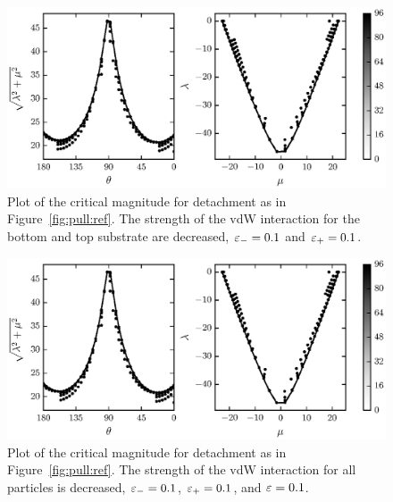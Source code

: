    \begin{figure}[t]
      \begin{center}
         \includegraphics{./fig/ch3/pull/eb0.1_et0.1/grid.eps}
      \end{center}      
      \caption{Plot of the critical magnitude for detachment as in Figure~\ref{fig:pull:ref}. The strength of the vdW interaction for the bottom and top substrate are decreased, $\varepsilon_-=0.1$ and $\varepsilon_+=0.1$.
      \label{fig:pull:eb0.1_et0.1}}
   \end{figure}
   
   \begin{figure}[t]
      \begin{center}
         \includegraphics{./fig/ch3/pull/eb0.1_et0.1_e0.1/grid.eps}
      \end{center}      
      \caption{Plot of the critical magnitude for detachment as in Figure~\ref{fig:pull:ref}. The strength of the vdW interaction for all particles is decreased, $\varepsilon_-=0.1$, $\varepsilon_+=0.1$, and $\varepsilon=0.1$.
      \label{fig:pull:eb0.1_et0.1_e0.1}}
   \end{figure}

